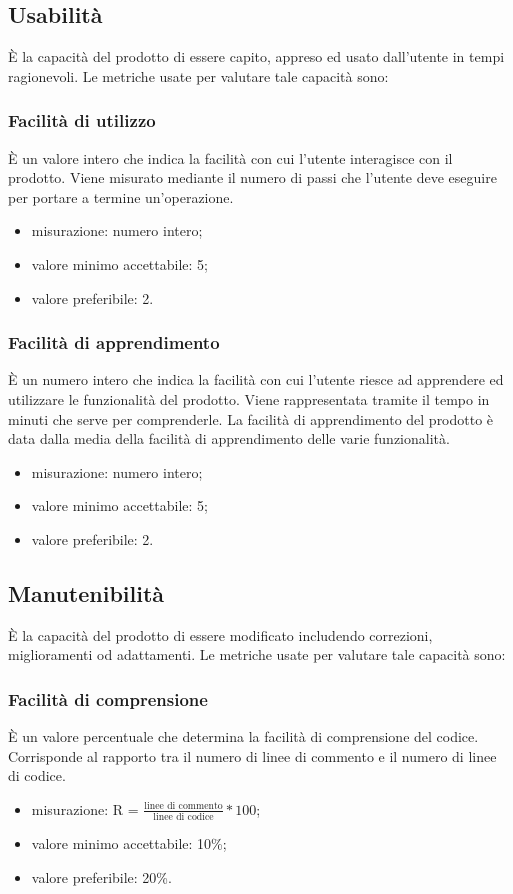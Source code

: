 \subsection{Usabilità}
È la capacità del prodotto di essere capito, appreso ed usato dall'utente in tempi ragionevoli.
Le metriche usate per valutare tale capacità sono:

	\subsubsection*{Facilità di utilizzo}
	È un valore intero che indica la facilità con cui l'utente interagisce con il prodotto. Viene misurato mediante il numero di passi che l'utente deve eseguire per portare a termine un'operazione.
	\begin{itemize}
		\item {misurazione: numero intero;}
		\item {valore minimo accettabile: 5;}
		\item {valore preferibile: 2.}
		\end{itemize}
		
	\subsubsection*{Facilità di apprendimento}
	È un numero intero che indica la facilità con cui l'utente riesce ad apprendere ed utilizzare le funzionalità del prodotto. Viene rappresentata tramite il tempo in minuti che serve per comprenderle. La facilità di apprendimento del prodotto è data dalla media della facilità di apprendimento delle varie funzionalità.
	\begin{itemize}
		\item {misurazione: numero intero;}
		\item {valore minimo accettabile: 5;}
		\item {valore preferibile: 2.}
	\end{itemize}
	
\subsection{Manutenibilità}
È la capacità del prodotto di essere modificato includendo correzioni, miglioramenti od adattamenti. 
Le metriche usate per valutare tale capacità sono:

	\subsubsection*{Facilità di comprensione}
	È un valore percentuale che determina la facilità di comprensione del codice. Corrisponde al rapporto tra il numero di linee di commento e il numero di linee di codice.
	\begin{itemize}
		\item{misurazione: R = $\displaystyle\frac{\mbox{linee di commento}}{\mbox{linee di codice}}*100$;}
		\item {valore minimo accettabile: 10\%;}
		\item {valore preferibile: 20\%.}
	\end{itemize}
	

